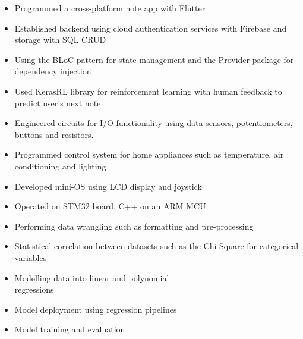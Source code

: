 \documentclass[11pt,a4paper,ragged2e]{altacv}
\begin{document}
\begin{paracol}{2}
\begin{itemize}
\item Programmed a cross-platform note app with Flutter
\item Established backend using cloud authentication services with Firebase and storage with SQL CRUD 
\item Using the BLoC pattern for state management and the Provider package for dependency injection
\item Used KerasRL library for reinforcement learning with human feedback to predict user's next note
\end{itemize}
\divider

\begin{itemize}
\item Engineered circuits for I/O functionality using data sensors, potentiometers, buttons and resistors.
\item Programmed control system for home appliances such as temperature, air conditioning and lighting 
\item Developed mini-OS using LCD display and joystick 
\item Operated on STM32 board, C++ on an ARM MCU
\end{itemize}


\switchcolumn
\newpage

\begin{itemize}
\item Performing data wrangling  such as formatting and pre-processing
\item Statistical correlation between datasets such as the Chi-Square for categorical variables
\item Modelling data into linear and polynomial \\ regressions
\item Model deployment using regression pipelines
\item Model training and evaluation
\end{itemize}
\divider


\end{paracol}
\end{document}
